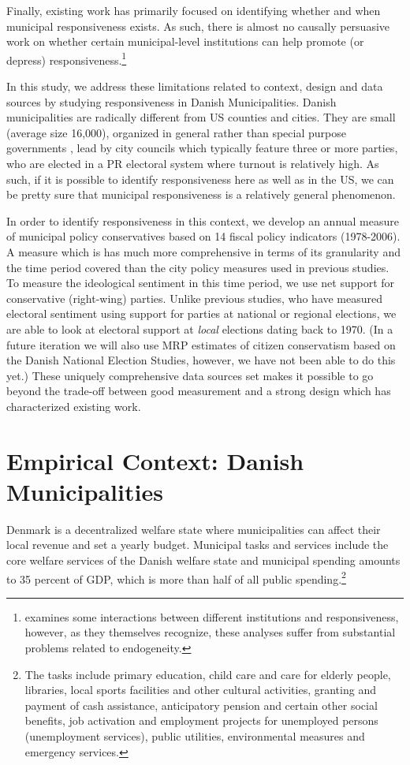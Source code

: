 \documentclass[a4paper,12pt]{article}
\begin{document}
Finally, existing work has primarily focused on identifying whether and when municipal responsiveness exists. As such, there is almost no causally persuasive work on whether certain municipal-level institutions can help promote (or depress) responsiveness.\footnote{\cite{tausanovitch2014representation} examines some interactions between different institutions and responsiveness, however, as they themselves recognize, these analyses suffer from substantial problems related to endogeneity.} 

In this study, we address these limitations related to context, design and data sources by studying responsiveness in Danish Municipalities. Danish municipalities are radically different from US counties and cities. They are small (average size 16,000), organized in general rather than special purpose governments \citep{berry2009imperfect}, lead by city councils which typically feature three or more parties, who are elected in a PR electoral system where turnout is relatively high. As such, if it is possible to identify responsiveness here as well as in the US, we can be pretty sure that municipal responsiveness is a relatively general phenomenon.

In order to identify responsiveness in this context, we develop an annual measure of municipal policy conservatives based on 14 fiscal policy indicators (1978-2006). A measure which is has much more comprehensive in terms of its granularity and the time period covered than the city policy measures used in previous studies. To measure the ideological sentiment in this time period, we use net support for conservative (right-wing) parties. Unlike previous studies, who have measured electoral sentiment using support for parties at national or regional elections, we are able to look at electoral support at \textit{local} elections dating back to 1970. (In a future iteration we will also use MRP estimates of citizen conservatism based on the Danish National Election Studies, however, we have not been able to do this yet.) These uniquely comprehensive data sources set makes it possible to  go beyond the trade-off between good measurement and a strong design which has characterized existing work. 



\section{Empirical Context: Danish Municipalities}	
Denmark is a decentralized welfare state where municipalities can affect their local revenue and set a yearly budget.  Municipal tasks and services include the core welfare services of the Danish welfare state and municipal spending amounts to 35 percent of GDP, which is more than half of all public spending.\footnote{The tasks include primary education, child care and care for elderly people, libraries, local sports facilities and other cultural activities, granting and payment of cash assistance, anticipatory pension and certain other social benefits, job activation and employment projects for unemployed persons (unemployment services), public utilities, environmental measures and emergency services.}
\end{document}

